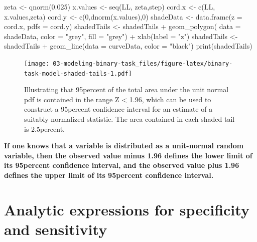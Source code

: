 \documentclass[
]{book}
\newenvironment{Shaded}{\begin{snugshade}}{\end{snugshade}}
\newcommand{\AttributeTok}[1]{\textcolor[rgb]{0.77,0.63,0.00}{#1}}
\newcommand{\DecValTok}[1]{\textcolor[rgb]{0.00,0.00,0.81}{#1}}
\newcommand{\FloatTok}[1]{\textcolor[rgb]{0.00,0.00,0.81}{#1}}
\newcommand{\FunctionTok}[1]{\textcolor[rgb]{0.00,0.00,0.00}{#1}}
\newcommand{\NormalTok}[1]{#1}
\newcommand{\OtherTok}[1]{\textcolor[rgb]{0.56,0.35,0.01}{#1}}
\newcommand{\SpecialCharTok}[1]{\textcolor[rgb]{0.00,0.00,0.00}{#1}}
\newcommand{\StringTok}[1]{\textcolor[rgb]{0.31,0.60,0.02}{#1}}
\begin{document}
\begin{Shaded}
\begin{Highlighting}[]
\NormalTok{zeta }\OtherTok{\textless{}{-}} \FunctionTok{qnorm}\NormalTok{(}\FloatTok{0.025}\NormalTok{)}
\NormalTok{x.values }\OtherTok{\textless{}{-}} \FunctionTok{seq}\NormalTok{(LL, zeta,step)}
\NormalTok{cord.x }\OtherTok{\textless{}{-}} \FunctionTok{c}\NormalTok{(LL, x.values,zeta) }
\NormalTok{cord.y }\OtherTok{\textless{}{-}} \FunctionTok{c}\NormalTok{(}\DecValTok{0}\NormalTok{,}\FunctionTok{dnorm}\NormalTok{(x.values),}\DecValTok{0}\NormalTok{) }
\NormalTok{shadeData }\OtherTok{\textless{}{-}} \FunctionTok{data.frame}\NormalTok{(}\AttributeTok{z =}\NormalTok{ cord.x, }\AttributeTok{pdfs =}\NormalTok{ cord.y)}
\NormalTok{shadedTails }\OtherTok{\textless{}{-}}\NormalTok{ shadedTails }\SpecialCharTok{+} 
  \FunctionTok{geom\_polygon}\NormalTok{(}
    \AttributeTok{data =}\NormalTok{ shadeData, }\AttributeTok{color =} \StringTok{"grey"}\NormalTok{, }\AttributeTok{fill =} \StringTok{"grey"}\NormalTok{) }\SpecialCharTok{+} 
  \FunctionTok{xlab}\NormalTok{(}\AttributeTok{label =} \StringTok{"z"}\NormalTok{) }
\NormalTok{shadedTails }\OtherTok{\textless{}{-}}\NormalTok{ shadedTails }\SpecialCharTok{+} 
  \FunctionTok{geom\_line}\NormalTok{(}\AttributeTok{data =}\NormalTok{ curveData, }\AttributeTok{color =} \StringTok{"black"}\NormalTok{)}
\FunctionTok{print}\NormalTok{(shadedTails)}
\end{Highlighting}
\end{Shaded}

\begin{figure}
\centering
\texttt{[image: 03-modeling-binary-task\_files/figure-latex/binary-task-model-shaded-tails-1.pdf]}
\caption{\label{fig:binary-task-model-shaded-tails}Illustrating that 95percent of the total area under the unit normal pdf is contained in the range \textbar Z\textbar{} \textless{} 1.96, which can be used to construct a 95percent confidence interval for an estimate of a suitably normalized statistic. The area contained in each shaded tail is 2.5percent.}
\end{figure}

\textbf{If one knows that a variable is distributed as a unit-normal random variable, then the observed value minus 1.96 defines the lower limit of its 95percent confidence interval, and the observed value plus 1.96 defines the upper limit of its 95percent confidence interval.}

\hypertarget{binary-task-model-sensitivity-specificity}{%
\section{Analytic expressions for specificity and sensitivity}\label{binary-task-model-sensitivity-specificity}}
\end{document}
